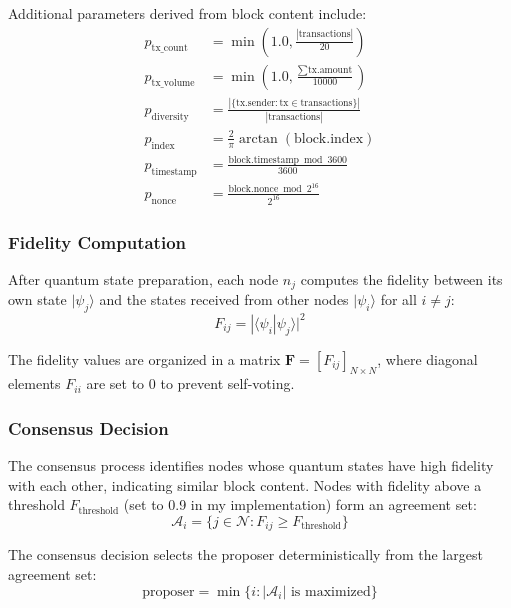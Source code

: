 \documentclass[11pt,a4paper]{article}
\begin{document}
Additional parameters derived from block content include:
\begin{equation}
\begin{aligned}
p_{\text{tx\_count}} &= \min(1.0, \frac{|\text{transactions}|}{20}) \\
p_{\text{tx\_volume}} &= \min(1.0, \frac{\sum \text{tx.amount}}{10000}) \\
p_{\text{diversity}} &= \frac{|\{\text{tx.sender} : \text{tx} \in \text{transactions}\}|}{|\text{transactions}|} \\
p_{\text{index}} &= \frac{2}{\pi} \arctan(\text{block.index}) \\
p_{\text{timestamp}} &= \frac{\text{block.timestamp} \bmod 3600}{3600} \\
p_{\text{nonce}} &= \frac{\text{block.nonce} \bmod 2^{16}}{2^{16}}
\end{aligned}
\end{equation}

\subsubsection{Fidelity Computation}
After quantum state preparation, each node $n_j$ computes the fidelity between its own state $|\psi_j\rangle$ and the states received from other nodes $|\psi_i\rangle$ for all $i \neq j$:
\begin{equation}
F_{ij} = |\langle\psi_i|\psi_j\rangle|^2
\end{equation}

The fidelity values are organized in a matrix $\mathbf{F} = [F_{ij}]_{N \times N}$, where diagonal elements $F_{ii}$ are set to 0 to prevent self-voting.

\subsubsection{Consensus Decision}
The consensus process identifies nodes whose quantum states have high fidelity with each other, indicating similar block content. Nodes with fidelity above a threshold $F_{\text{threshold}}$ (set to 0.9 in my implementation) form an agreement set:
\begin{equation}
\mathcal{A}_i = \{j \in \mathcal{N} : F_{ij} \geq F_{\text{threshold}}\}
\end{equation}

The consensus decision selects the proposer deterministically from the largest agreement set:
\begin{equation}
\text{proposer} = \min\{i : |\mathcal{A}_i| \text{ is maximized}\}
\end{equation}
\end{document}
